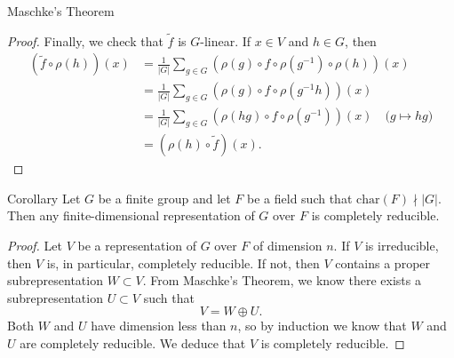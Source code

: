 \begin{frame}{Maschke's Theorem}
\begin{proof}
 { Finally, we check that $\widetilde{f}$ is $G$-linear.  If $x \in V$ and $h \in G$, then
\begin{align*}
(\widetilde{f} \circ \rho(h))(x) &= \frac{1}{|G|} \sum_{g \in G} (\rho(g) \circ f \circ \rho(g^{-1}) \circ \rho(h))(x) \\
&= \frac{1}{|G|} \sum_{g \in G} (\rho(g) \circ f \circ \rho(g^{-1} h))(x) \\
&=\frac{1}{|G|} \sum_{g \in G} (\rho(hg) \circ f \circ \rho(g^{-1}))(x) \quad \text{(} g \mapsto hg \text{)} \\
&= (\rho(h) \circ \widetilde{f}) (x).
\end{align*}}
\end{proof}
\end{frame}

\begin{frame}
\begin{block}{Corollary}
Let $G$ be a finite group and let $F$ be a field such that $\text{char}(F) \nmid |G|$. Then any finite-dimensional representation of $G$ over $F$ is completely reducible.
\end{block}
\begin{proof}
Let $V$ be a representation of $G$ over $F$ of dimension $n$.  If $V$ is irreducible, then $V$ is, in particular, completely reducible.  If not, then $V$ contains a proper subrepresentation $W \subset V$.  From Maschke's Theorem, we know there exists a subrepresentation $U \subset V$ such that 
\begin{equation}  V = W \oplus U. \end{equation}
Both $W$ and $U$ have dimension less than $n$, so by induction we know that $W$ and $U$ are completely reducible. We deduce that $V$ is completely reducible.
\end{proof}
\end{frame}

